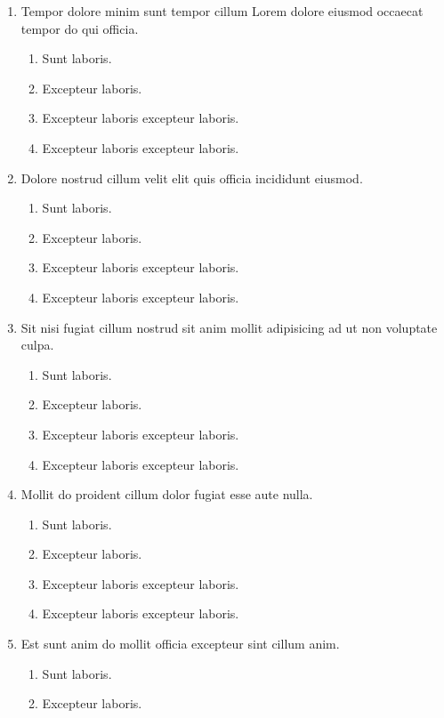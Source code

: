 \documentclass[a4paper,12pt]{article}
\begin{document}
\begin{enumerate}[label=\textbf{\arabic*.}]
\begin{enumerate}
  \end{enumerate}
  \item Tempor dolore minim sunt tempor cillum Lorem dolore eiusmod occaecat tempor do qui officia.
  \begin{enumerate}
    \item Sunt laboris.
    \item Excepteur laboris.
    \item Excepteur laboris excepteur laboris.
    \item Excepteur laboris excepteur laboris.
  \end{enumerate}
  \item Dolore nostrud cillum velit elit quis officia incididunt eiusmod.
  \begin{enumerate}
    \item Sunt laboris.
    \item Excepteur laboris.
    \item Excepteur laboris excepteur laboris.
    \item Excepteur laboris excepteur laboris.
  \end{enumerate}
  \item Sit nisi fugiat cillum nostrud sit anim mollit adipisicing ad ut non voluptate culpa.
  \begin{enumerate}
    \item Sunt laboris.
    \item Excepteur laboris.
    \item Excepteur laboris excepteur laboris.
    \item Excepteur laboris excepteur laboris.
  \end{enumerate}
  \item Mollit do proident cillum dolor fugiat esse aute nulla.
  \begin{enumerate}
    \item Sunt laboris.
    \item Excepteur laboris.
    \item Excepteur laboris excepteur laboris.
    \item Excepteur laboris excepteur laboris.
  \end{enumerate}
  \item Est sunt anim do mollit officia excepteur sint cillum anim.
  \begin{enumerate}
    \item Sunt laboris.
    \item Excepteur laboris.

\end{enumerate}
\end{enumerate}
\end{document}
